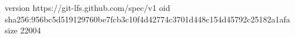 version https://git-lfs.github.com/spec/v1
oid sha256:956bc5d519129760be7fcb3c10f4d42774c3701d448c154d45792c25182a1afa
size 22004
